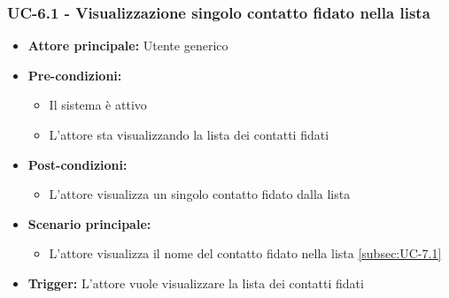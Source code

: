 \documentclass[a4paper,12pt]{article}
\begin{document}
\subsubsection{UC-6.1 - Visualizzazione singolo contatto fidato nella lista} \label{subsec:UC-6.1}
\begin{itemize}
    \item \textbf{Attore principale:} Utente generico
    \item \textbf{Pre-condizioni:} 
    \begin{itemize}
        \item Il sistema è attivo
        \item L'attore sta visualizzando la lista dei contatti fidati
    \end{itemize}
    \item \textbf{Post-condizioni:}
    \begin{itemize}
        \item L'attore visualizza un singolo contatto fidato dalla lista
    \end{itemize}
    \item \textbf{Scenario principale:} 
    \begin{itemize}
        \item L'attore visualizza il nome del contatto fidato nella lista \ref{subsec:UC-7.1}
    \end{itemize}
    \item \textbf{Trigger:} L'attore vuole visualizzare la lista dei contatti fidati
\end{itemize}
\end{document}
